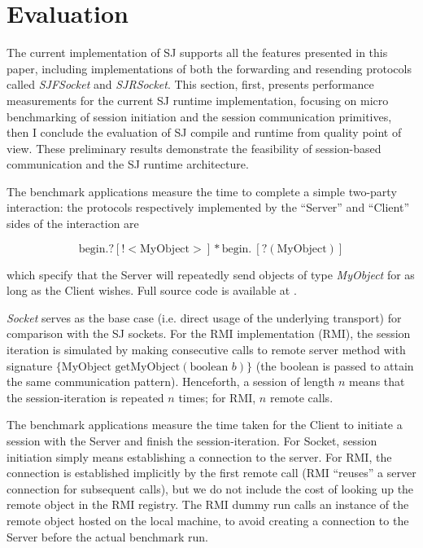 \chapter{Evaluation}
\label{chap:evaluation}

The current implementation of SJ supports all the features presented in this paper, including implementations of both the forwarding and resending protocols called \textit{SJFSocket} and \textit{SJRSocket}. This section, first, presents performance measurements for the current SJ runtime implementation, focusing on micro benchmarking of session initiation and the session communication primitives, then I conclude the evaluation of SJ compile and runtime from quality point of view. These preliminary results demonstrate the feasibility of session-based communication and the SJ runtime architecture.

The benchmark applications measure the time to complete a simple two-party interaction: the protocols respectively implemented by the ``Server'' and ``Client'' sides of the interaction are

\begin{equation}
\text{begin}.?[!<\text{MyObject}>]*\text{begin}.~[?(\text{MyObject})]
\end{equation}

which specify that the Server will repeatedly send objects of type \textit{MyObject} for as long as the Client wishes. Full source code is available at \cite{thesis}.

\textit{Socket} serves as the base case (i.e. direct usage of the underlying transport) for comparison with the SJ sockets. For the RMI implementation (RMI), the session iteration is simulated by making consecutive calls to  remote server method with signature $\{\text{MyObject }  \text{getMyObject}(\text{boolean } b)\}$ (the boolean is passed to attain the same communication pattern). Henceforth, a session of length $n$ means that the session-iteration is repeated $n$ times; for RMI, $n$ remote calls.

The benchmark applications measure the time taken for the Client to initiate a session with the Server and finish the session-iteration. For Socket, session initiation simply means establishing a connection to the server. For RMI, the connection is established implicitly by the first remote call (RMI ``reuses'' a server connection for subsequent calls), but we do not include the cost of looking up the remote object in the RMI registry. The RMI dummy run calls an instance of the remote object hosted on the local machine, to avoid creating a connection to the Server before the actual benchmark run.

